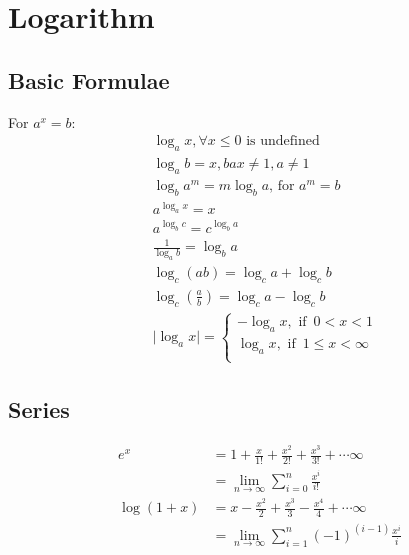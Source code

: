 \documentclass[../main.tex]{subfiles}
\begin{document}
	\chapter{Logarithm}
	\section{Basic Formulae}
	For $a^x=b$:
	\begin{align}
		& \log_{a}{x}, \forall x \leq 0 \text{ is undefined}\\
		& \log_a b = x, bax \neq 1, a \neq 1\\
		& \log_b a^m = m \log_b a \text{, for } a^m=b\\
		& a^{\log_a x} = x\\
		& a^{\log_b c} = c^{\log_b a}\\
		& \frac{1}{\log_a b} = \log_b a\\
		& \log_c (ab) = \log_c a+\log_c b\\
		& \log_c \left( \frac{a}{b} \right) = \log_c a-\log_c b\\
		& \vert \log_a x \vert=\begin{cases}
			-\log_a x, \text{ if } \, 0 < x < 1\\
			\log_a x, \text{ if } \, 1\leq x < \infty \\
		\end{cases}
	\end{align}
	

		\section{Series}
		\begin{align}
			e^x  & = 1 + \frac{x}{1!} + \frac{x^2}{2!} + \frac{x^3}{3!} + \cdots \infty \\
			& = \lim_{n \to \infty} \sum_{i=0}^{n} \frac{x^i}{i!} \\
			\log(1+x) & = x - \frac{x^2}{2} + \frac{x^3}{3} - \frac{x^4}{4} + \cdots \infty\\
			& = \lim_{n\to\infty} \sum_{i=1}^{n}(-1)^{(i-1)} \frac{x^i}{i}
		\end{align}
\end{document}
